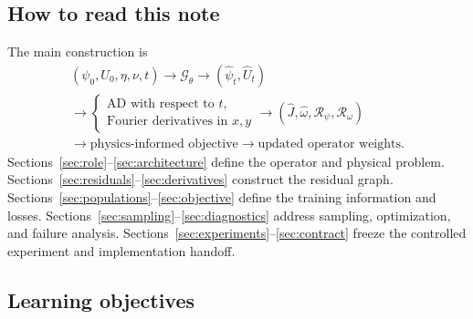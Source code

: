 \documentclass[11pt]{article}
\newcommand{\Rpsi}{\mathcal{R}_{\psi}}
\newcommand{\Romega}{\mathcal{R}_{\omega}}
\begin{document}
\subsection*{How to read this note}

The main construction is
\[
\begin{gathered}
(\psi_0,U_0,\eta,\nu,t)
\longrightarrow \mathcal{G}_\theta
\longrightarrow (\widehat\psi_t,\widehat U_t)\\
\longrightarrow
\left\{\begin{array}{l}
\text{AD with respect to }t,\\
\text{Fourier derivatives in }x,y
\end{array}\right.
\longrightarrow
(\widehat J,\widehat\omega,\Rpsi,\Romega)\\
\longrightarrow
\text{physics-informed objective}
\longrightarrow
\text{updated operator weights}.
\end{gathered}
\]
Sections~\ref{sec:role}--\ref{sec:architecture} define the operator and physical problem. Sections~\ref{sec:residuals}--\ref{sec:derivatives} construct the residual graph. Sections~\ref{sec:populations}--\ref{sec:objective} define the training information and losses. Sections~\ref{sec:sampling}--\ref{sec:diagnostics} address sampling, optimization, and failure analysis. Sections~\ref{sec:experiments}--\ref{sec:contract} freeze the controlled experiment and implementation handoff.

\subsection*{Learning objectives}
\end{document}
